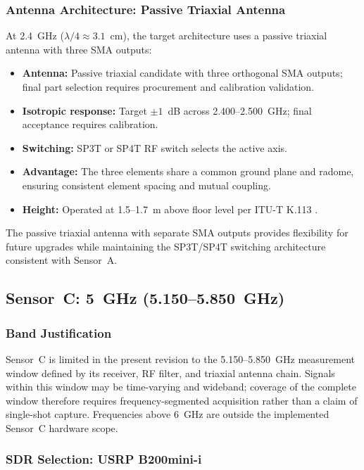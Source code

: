 \documentclass[11pt,a4paper]{article}
\begin{document}
\subsubsection{Antenna Architecture: Passive Triaxial Antenna}

At 2.4~GHz ($\lambda/4 \approx 3.1$~cm), the target architecture uses a passive triaxial antenna with three SMA outputs:

\begin{itemize}
    \item \textbf{Antenna:} Passive triaxial candidate with three orthogonal SMA outputs; final part selection requires procurement and calibration validation.
    \item \textbf{Isotropic response:} Target $\pm 1$~dB across 2.400--2.500~GHz; final acceptance requires calibration.
    \item \textbf{Switching:} SP3T or SP4T RF switch selects the active axis.
    \item \textbf{Advantage:} The three elements share a common ground plane and radome, ensuring consistent element spacing and mutual coupling.
    \item \textbf{Height:} Operated at 1.5--1.7~m above floor level per ITU-T K.113 \cite{itut_k113}.
\end{itemize}

\noindent The passive triaxial antenna with separate SMA outputs provides flexibility for future upgrades while maintaining the SP3T/SP4T switching architecture consistent with Sensor~A.

\subsection{Sensor~C: 5~GHz (5.150--5.850~GHz)}

\subsubsection{Band Justification}

Sensor~C is limited in the present revision to the 5.150--5.850~GHz measurement window defined by its receiver, RF filter, and triaxial antenna chain. Signals within this window may be time-varying and wideband; coverage of the complete window therefore requires frequency-segmented acquisition rather than a claim of single-shot capture. Frequencies above 6~GHz are outside the implemented Sensor~C hardware scope.

\subsubsection{SDR Selection: USRP B200mini-i}
\end{document}
